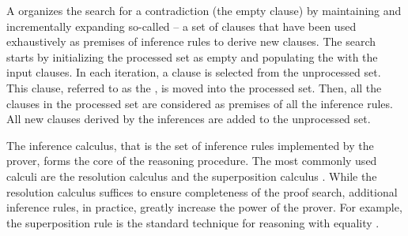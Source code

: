 A  organizes the search for a contradiction
(the empty clause)
by maintaining and incrementally expanding so-called  -- a set of clauses that have been used exhaustively as premises of inference rules to derive new clauses.
The search starts by initializing the processed set as empty and populating the  with the input clauses.
In each iteration,
a clause is selected from the unprocessed set.
This clause, referred to as the , is moved into the processed set.
Then, all the clauses in the processed set are considered as premises of all the inference rules.
All new clauses derived by the inferences are added to the unprocessed set.


The inference calculus, that is the set of inference rules implemented by the prover, forms the core of the reasoning procedure.
The most commonly used calculi are the resolution calculus \cite{} and the superposition calculus \cite{}.
While the resolution calculus suffices to ensure completeness of the proof search,
additional inference rules, in practice, greatly increase the power of the prover.
For example, the superposition rule is the standard technique for reasoning with equality \cite{}.

